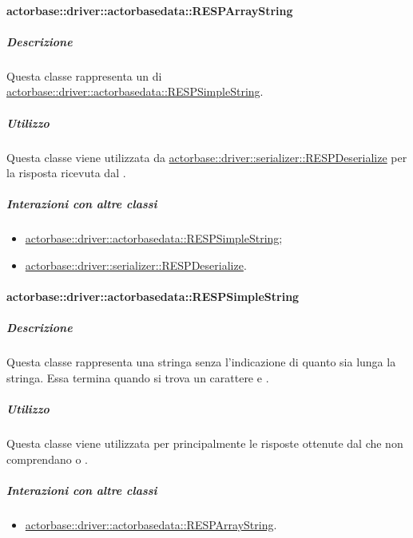 \documentclass{scalatekids-article}
\begin{document}
\paragraph{actorbase::driver::actorbasedata::RESPArrayString}
\label{sec:actorbase::driver::actorbasedata::RESPArrayString}

\subparagraph{Descrizione}

Questa classe rappresenta un  di
\hyperref[sec:actorbase::driver::actorbasedata::RESPSimpleString]{actorbase::driver::actorbasedata::RESPSimpleString}.

\subparagraph{Utilizzo}

Questa classe viene utilizzata da \hyperref[sec:actorbase::driver::serializer::RESPDeserialize]{actorbase::driver::serializer::RESPDeserialize}
per  la risposta ricevuta dal .

\subparagraph{Interazioni con altre classi}

\begin{itemize}
\item \hyperref[sec:actorbase::driver::actorbasedata::RESPSimpleString]{actorbase::driver::actorbasedata::RESPSimpleString};
\item \hyperref[sec:actorbase::driver::serializer::RESPDeserialize]{actorbase::driver::serializer::RESPDeserialize}.
\end{itemize}

\paragraph{actorbase::driver::actorbasedata::RESPSimpleString}
\label{sec:actorbase::driver::actorbasedata::RESPSimpleString}

\subparagraph{Descrizione}

Questa classe rappresenta una stringa senza l'indicazione di quanto sia lunga
la stringa. Essa termina quando si trova un carattere 
e .

\subparagraph{Utilizzo}

Questa classe viene utilizzata per  principalmente le
risposte ottenute dal  che non comprendano  o
.

\subparagraph{Interazioni con altre classi}

\begin{itemize}
\item \hyperref[sec:actorbase::driver::actorbasedata::RESPArrayString]{actorbase::driver::actorbasedata::RESPArrayString}.
\end{itemize}
\end{document}
